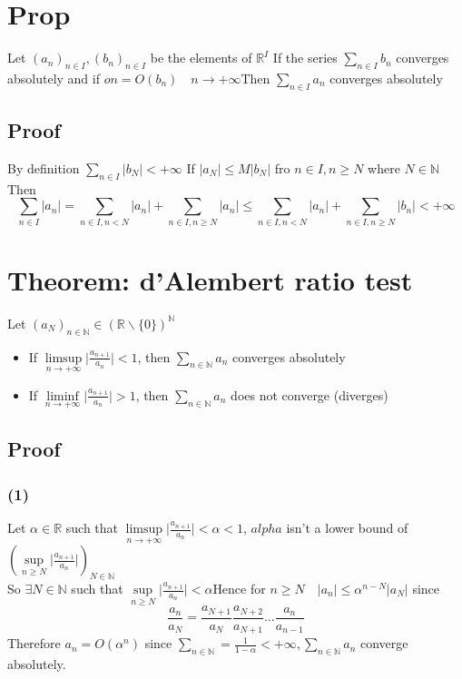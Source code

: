 \documentclass{book}
\begin{document}
\section{Prop}
Let $(a_n)_{n\in I},(b_n)_{n\in I}$ be the elements of $\mathbb{R}^I$ If the series $\sum\limits_{n\in I}b_n$ converges absolutely and if $on=O(b_n)\quad n\rightarrow+\infty$Then $\sum\limits_{n\in I}a_n$ converges absolutely
\subsection*{Proof}
By definition $\sum\limits_{n\in I}\lvert b_N\rvert<+\infty $ If $\lvert a_N\rvert\leq M\lvert b_N\rvert$ fro $n\in I,n\geq N$ where $N\in \mathbb{N} $ Then $$\sum\limits_{n\in I}\lvert a_n\rvert=\sum\limits_{n\in I,n<N}\lvert a_n\rvert+\sum\limits_{n\in I,n\geq N}\lvert a_n\rvert\leq\sum\limits_{n\in I,n<N}\lvert a_n\rvert+\sum\limits_{n\in I,n\geq N}\lvert b_n\rvert<+\infty$$
\section{Theorem: d'Alembert ratio test}
Let $(a_N)_{n\in \mathbb{N} }\in(\mathbb{R} \backslash\{0\})^\mathbb{N} $\begin{itemize}
    \item If $\limsup\limits_{n\rightarrow+\infty}\lvert\frac{a_{n+1}}{a_n}\rvert<1$, then $\sum\limits_{n\in \mathbb{N} }a_n$ converges absolutely
    \item If $\liminf\limits_{n\rightarrow+\infty}\lvert\frac{a_{n+1}}{a_n}\rvert>1$, then $\sum\limits_{n\in \mathbb{N} }a_n$ does not converge (diverges)
\end{itemize}
\subsection*{Proof}
\subsubsection*{(1)}Let $\alpha\in\mathbb{R} $ such that $\limsup\limits_{n\rightarrow+\infty}\lvert\frac{a_{n+1}}{a_n}\rvert<\alpha<1$, $alpha$ isn't a lower bound of $(\sup\limits_{n\geq N}\lvert\frac{a_{n+1}}{a_n}\rvert)_{N\in\mathbb{N} }$\\
So $\exists N\in\mathbb{N} $ such that $\sup\limits_{n\geq N}\lvert\frac{a_{n+1}}{a_n}\rvert<\alpha$Hence for $n\geq N\quad\lvert a_n\rvert\leq\alpha^{n-N}\lvert a_N\rvert$ since $$\frac{a_n}{a_N}=\frac{a_{N+1}}{a_N}
\frac{a_{N+2}}{a_{N+1}}...\frac{a_n}{a_{n-1}}$$
Therefore $a_n=O(\alpha^n)$ since $\sum\limits_{n\in\mathbb{N} }=\frac{1}{1-\alpha}<+\infty,\sum\limits_{n\in \mathbb{N} }a_n$ converge absolutely.
\end{document}
